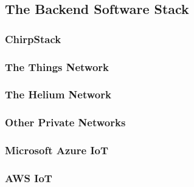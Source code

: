\subsection{The Backend Software Stack}
\subsubsection{ChirpStack}
\subsubsection{The Things Network}
\subsubsection{The Helium Network}
\subsubsection{Other Private Networks}
\subsubsection{Microsoft Azure IoT}
\subsubsection{AWS IoT}
